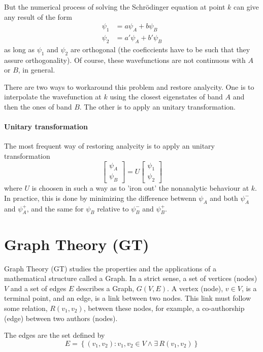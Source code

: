 \documentclass[a4paper,12pt]{report}
\begin{document}
But the numerical process of solving the Schr\"odinger equation at point $k$ can give any result of the form
\begin{align}
 \psi_1 &= a\psi_A + b\psi_B \\
 \psi_2 &= a'\psi_A + b'\psi_B
\end{align}
as long as $\psi_1$ and $\psi_2$ are orthogonal (the coeficcients have to be such that they assure orthogonality).
Of course, these wavefunctions are not continuous with $A$ or $B$, in general.

There are two ways to workaround this problem and restore analycity.
One is to interpolate the wavefunction at $k$ using the closest eigenstates of band $A$ and then the ones of band $B$.
The other is to apply an unitary transformation.


\paragraph*{Unitary transformation}
The most frequent way of restoring analycity is to apply an unitary transformation
\begin{equation}
 \left[ \begin{matrix}
  \psi_A\\\psi_B
 \end{matrix}\right] = U
 \left[ \begin{matrix}
  \psi_1\\\psi_2
 \end{matrix}\right]
\end{equation}
where $U$ is choosen in such a way as to 'iron out' the nonanalytic behaviour at $k$.
In practice, this is done by minimizing the difference betwenn $\psi_A$ and both $\psi_A^-$ and $\psi_A^+$,
and the same for $\psi_B$ relative to $\psi_B^-$ and $\psi_B^+$.


\section{Graph Theory (GT)}

Graph Theory (GT) studies the properties and the applications of a mathematical structure called a Graph.
In a strict sense, a set of vertices (nodes) $V$ and a set of edges $E$ describes a Graph, $G(V, E)$.
A vertex (node), $v\in V$, is a terminal point, and an edge, is a link between two nodes.
This link must follow some relation, $R(v_1, v_2)$, between these nodes, for example, a co-authorship (edge) between two authors (nodes).

The edges are the set defined by
\begin{equation}
    E = \left\{(v_1, v_2) : v_1, v_2 \in V \wedge \exists\, R(v_1, v_2)\right\}
\end{equation}
\end{document}

